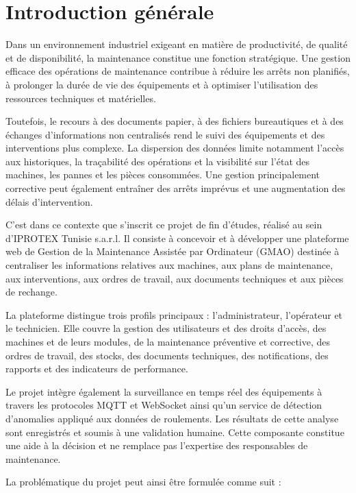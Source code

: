 \section*{Introduction générale}

Dans un environnement industriel exigeant en matière de productivité, de qualité et de disponibilité, la maintenance constitue une fonction stratégique. Une gestion efficace des opérations de maintenance contribue à réduire les arrêts non planifiés, à prolonger la durée de vie des équipements et à optimiser l’utilisation des ressources techniques et matérielles.

Toutefois, le recours à des documents papier, à des fichiers bureautiques et à des échanges d’informations non centralisés rend le suivi des équipements et des interventions plus complexe. La dispersion des données limite notamment l’accès aux historiques, la traçabilité des opérations et la visibilité sur l’état des machines, les pannes et les pièces consommées. Une gestion principalement corrective peut également entraîner des arrêts imprévus et une augmentation des délais d’intervention.

C’est dans ce contexte que s’inscrit ce projet de fin d’études, réalisé au sein d’IPROTEX Tunisie s.a.r.l. Il consiste à concevoir et à développer une plateforme web de Gestion de la Maintenance Assistée par Ordinateur (GMAO) destinée à centraliser les informations relatives aux machines, aux plans de maintenance, aux interventions, aux ordres de travail, aux documents techniques et aux pièces de rechange.

La plateforme distingue trois profils principaux : l’administrateur, l’opérateur et le technicien. Elle couvre la gestion des utilisateurs et des droits d’accès, des machines et de leurs modules, de la maintenance préventive et corrective, des ordres de travail, des stocks, des documents techniques, des notifications, des rapports et des indicateurs de performance.

Le projet intègre également la surveillance en temps réel des équipements à travers les protocoles MQTT et WebSocket ainsi qu’un service de détection d’anomalies appliqué aux données de roulements. Les résultats de cette analyse sont enregistrés et soumis à une validation humaine. Cette composante constitue une aide à la décision et ne remplace pas l’expertise des responsables de maintenance.

La problématique du projet peut ainsi être formulée comme suit :


